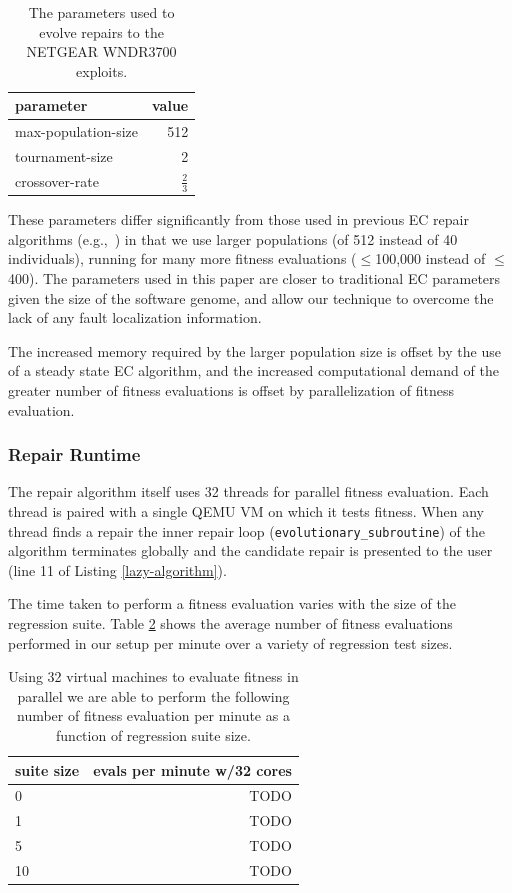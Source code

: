 \documentclass{sigcomm-alternate}
\begin{document}
\begin{table}[htb]
\centering
\begin{tabular}{lr}
parameter           & value         \\
\hline
max-population-size & 512           \\
tournament-size     & 2             \\
crossover-rate      & $\frac{2}{3}$ \\
\end{tabular}\caption{\label{parameters}The parameters used to evolve repairs to the NETGEAR WNDR3700 exploits.}

\end{table}

These parameters differ significantly from those used in previous EC
repair algorithms
(e.g.,~\cite{forrest2009genetic,legoues2011systematicstudy,le2012representations})
in that we
use larger populations (of 512 instead of 40 individuals), running for
many more fitness evaluations ($\leq$100,000 instead of $\leq$400).  The
parameters used in this paper are closer to traditional EC
parameters given the size of the software genome, and allow our
technique to overcome the lack of any fault localization information.

The increased memory required by the larger population size is offset
by the use of a steady state EC algorithm, and the increased
computational demand of the greater number of fitness evaluations is
offset by parallelization of fitness evaluation.

\subsubsection{Repair Runtime}
\label{sec-4-1-2}
The repair algorithm itself uses 32 threads for parallel fitness
evaluation.  Each thread is paired with a single QEMU VM on which it
tests fitness.  When any thread finds a repair the inner repair loop
(\texttt{evolutionary\_subroutine}) of the algorithm terminates globally and
the candidate repair is presented to the user (line 11 of Listing
\ref{lazy-algorithm}).

The time taken to perform a fitness evaluation varies with the size of
the regression suite.  Table \ref{test-speed} shows the average number of
fitness evaluations performed in our setup per minute over a variety
of regression test sizes.

\begin{table}[htb]
\centering
\begin{tabular}{l|r}
suite size & evals per minute w/32 cores \\
\hline
0          & TODO                        \\
1          & TODO                        \\
5          & TODO                        \\
10         & TODO                        \\
\end{tabular}\caption{\label{test-speed}Using 32 virtual machines to evaluate fitness in parallel we are able to perform the following number of fitness evaluation per minute as a function of regression suite size.}
\end{table}
\end{document}
